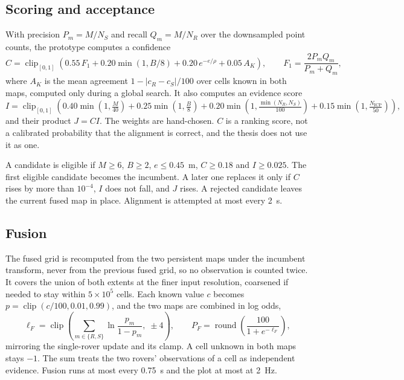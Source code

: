 \subsection{Scoring and acceptance}

With precision $P_m = M / N_S$ and recall $Q_m = M / N_R$ over the downsampled point counts, the prototype computes a confidence
\begin{equation}
  C = \operatorname{clip}_{[0,1]}\!\left(0.55\,F_1 + 0.20\min(1, B/8) + 0.20\,e^{-e/\rho} + 0.05\,A_K\right),
  \qquad F_1 = \frac{2 P_m Q_m}{P_m + Q_m},
\end{equation}
where $A_K$ is the mean agreement $1 - |c_R - c_S|/100$ over cells known in both maps, computed only during a global search.
It also computes an evidence score
\begin{equation}
  I = \operatorname{clip}_{[0,1]}\!\left(0.40\min(1, \tfrac{M}{40}) + 0.25\min(1, \tfrac{B}{8}) + 0.20\min(1, \tfrac{\min(N_R, N_S)}{100}) + 0.15\min(1, \tfrac{N_{\text{ICP}}}{50})\right),
\end{equation}
and their product $J = CI$.
The weights are hand-chosen.
$C$ is a ranking score, not a calibrated probability that the alignment is correct, and the thesis does not use it as one.

A candidate is eligible if $M \ge 6$, $B \ge 2$, $e \le 0.45$~m, $C \ge 0.18$ and $I \ge 0.025$.
The first eligible candidate becomes the incumbent.
A later one replaces it only if $C$ rises by more than $10^{-4}$, $I$ does not fall, and $J$ rises.
A rejected candidate leaves the current fused map in place.
Alignment is attempted at most every 2~s.

\subsection{Fusion}

The fused grid is recomputed from the two persistent maps under the incumbent transform, never from the previous fused grid, so no observation is counted twice.
It covers the union of both extents at the finer input resolution, coarsened if needed to stay within $5 \times 10^5$ cells.
Each known value $c$ becomes $p = \operatorname{clip}(c/100, 0.01, 0.99)$, and the two maps are combined in log odds,
\begin{equation}
  \ell_F = \operatorname{clip}\!\left(\sum_{m \in \{R, S\}} \ln\frac{p_m}{1 - p_m},\; \pm 4\right),
  \qquad P_F = \operatorname{round}\!\left(\frac{100}{1 + e^{-\ell_F}}\right),
\end{equation}
mirroring the single-rover update and its clamp.
A cell unknown in both maps stays $-1$.
The sum treats the two rovers' observations of a cell as independent evidence.
Fusion runs at most every 0.75~s and the plot at most at 2~Hz.


